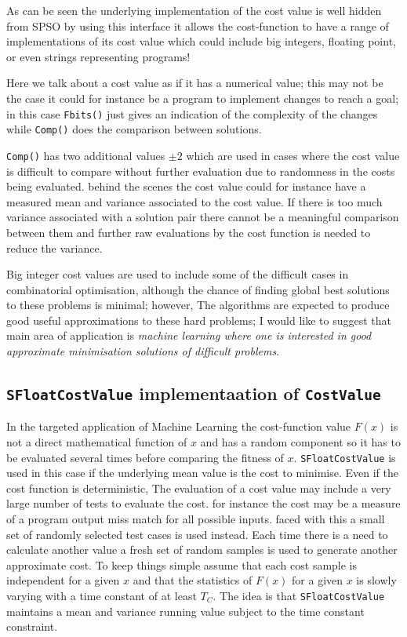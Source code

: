 \documentclass[a4paper,oneside,english]{book}
\numberwithin{equation}{section}
\numberwithin{figure}{section}
\begin{document}
As can be seen the underlying implementation of the cost value is well hidden from SPSO by using this interface it allows the cost-function to have a range of implementations  of its cost value which could include big integers, floating point, or even strings representing programs! 

Here we talk about a cost value as if it has a numerical value; this may not be  the case it could for instance be a program to implement changes to reach a goal; in this case  \texttt{Fbits()} just gives an indication of the complexity of the changes while \texttt{Comp()} does the comparison between solutions. 

\texttt{Comp()} has two additional values $\pm2$ which are used in cases where the cost value is difficult to compare without further evaluation due to randomness in the costs being evaluated. behind the scenes the cost value could for instance have a measured mean and variance associated to the cost value. If there is too much variance associated with a solution pair there cannot be a meaningful comparison between them and further raw  evaluations by the cost function is needed  to reduce the variance.  

Big integer cost values are used to include some of the difficult cases in combinatorial optimisation, although the chance of finding global best solutions to these problems is minimal; however, The algorithms are expected to produce good useful approximations to these hard problems; I would like to suggest that main area of application is \emph{machine learning where one is interested in good approximate minimisation solutions of difficult problems}.




\subsection{\texttt{SFloatCostValue} implementaation of \texttt{CostValue}}

In the targeted application of Machine Learning the cost-function  value $F(x)$ is not a direct mathematical function of $x$ and has a random component so it has to be evaluated several times before comparing the fitness of $x$. \texttt{SFloatCostValue}  is used in this case if the underlying mean value is the cost to minimise.  Even if the  cost function is deterministic, The evaluation of a cost value may include a very large number of tests to evaluate  the cost. for instance the cost may be a measure of a program output miss match for all possible inputs. faced with this a small set of randomly selected test cases is used instead. Each time there is a need to calculate another value a fresh set of random samples is used to generate another approximate cost. To keep things simple assume that each cost sample is independent for a given $x$ and that the statistics of $F(x)$ for a given $x$ is slowly varying with a time constant of at least $T_C$. The idea is that  \texttt{SFloatCostValue}  maintains a mean and variance running value subject to the time constant constraint. 
\end{document}
